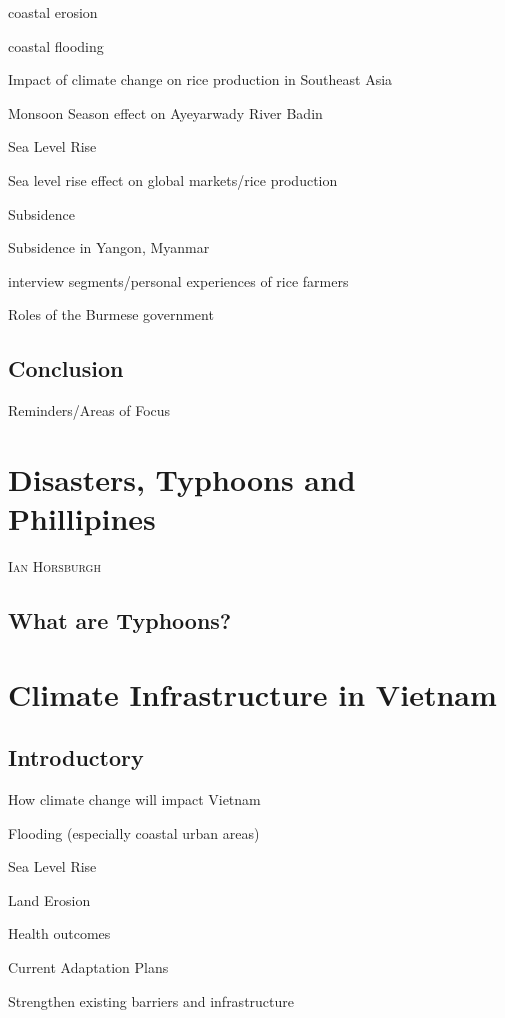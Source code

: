 \documentclass{book}\usepackage{knitr}
\makeatletter
\newcommand{\chapterauthor}[1]{%
  {\parindent0pt\vspace*{-25pt}%
  \linespread{1.1}\large\scshape#1%
  \par\nobreak\vspace*{35pt}}
  \@afterheading%
}
\makeatother
\begin{document}
coastal erosion

coastal flooding

Impact of climate change on rice production in Southeast Asia

Monsoon Season effect on Ayeyarwady River Badin

Sea Level Rise 

Sea level rise effect on global markets/rice production


Subsidence

Subsidence in Yangon, Myanmar

interview segments/personal experiences of rice farmers


Roles of the Burmese government

\section{Conclusion}

Reminders/Areas of Focus




\chapter{Disasters, Typhoons and Phillipines}

\chapterauthor{Ian Horsburgh}

\section{What are Typhoons?}



\chapter{Climate Infrastructure in Vietnam}

\section{Introductory}

How climate change will impact Vietnam

Flooding (especially coastal urban areas)

Sea Level Rise

Land Erosion

Health outcomes

Current Adaptation Plans

Strengthen existing barriers and infrastructure
\end{document}
